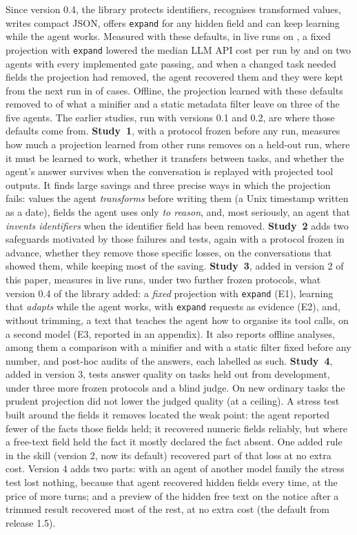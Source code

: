 Since version 0.4, the library protects identifiers, recognises transformed values, writes compact JSON,
offers \texttt{expand} for any hidden field and can keep learning while the agent works. Measured with these
defaults, in live runs on \texttt{\SthreeModelA}, a fixed projection with \texttt{expand} lowered the median LLM
API cost per run by \SthreeEOneTrimCosti{} and \SthreeEOneTrimCostiv{} on two agents with every implemented gate
passing, and when a changed task needed fields the projection had removed, the agent recovered them and they were
kept from the next run in \SthreeHFiveKept{} of \SthreeHFiveRecoveries{} cases. Offline, the projection learned with
these defaults removed \BaseLearnedStaticBigMin{} to \BaseLearnedStaticBigMax{} of what a minifier and a static
metadata filter leave on three of the five agents. The earlier studies, run with versions 0.1 and 0.2, are where
those defaults come from.
 \textbf{Study~1}, with a protocol frozen before any run, measures how much a projection
learned from other runs removes on a held-out run, where it must be learned to work, whether it transfers between
tasks, and whether the agent's answer survives when the conversation is replayed with projected tool outputs. It
finds large savings and three precise ways in which the projection fails: values the agent \emph{transforms}
before writing them (a Unix timestamp written as a date), fields the agent uses only \emph{to reason}, and, most
seriously, an agent that \emph{invents identifiers} when the identifier field has been removed. \textbf{Study~2}
adds two safeguards motivated by those failures and tests, again with a protocol frozen in advance, whether they
remove those specific losses, on the conversations that showed them, while keeping most of the saving.
\textbf{Study~3}, added in version 2 of this paper, measures in live runs, under two further frozen protocols, what
version 0.4 of the library added: a \emph{fixed} projection with \texttt{expand} (E1), learning that \emph{adapts}
while the agent works, with \texttt{expand} requests as evidence (E2), and, without trimming, a text that teaches the
agent how to organise its tool calls, on a second model (E3, reported in an appendix). It also reports offline
analyses, among them a comparison with a minifier and with a static filter fixed before any number, and post-hoc
audits of the answers, each labelled as such. \textbf{Study~4}, added in version 3, tests answer quality on tasks
held out from development, under three more frozen protocols and a blind judge. On new ordinary tasks the prudent
projection did not lower the judged quality (at a ceiling). A stress test built around the fields it removes
located the weak point: the agent reported fewer of the facts those fields held; it recovered numeric fields
reliably, but where a free-text field held the fact it mostly declared the fact absent. One added rule in the skill
(version 2, now its default) recovered part of that loss at no extra cost. Version 4 adds two parts: with an agent of
another model family the stress test lost nothing, because that agent recovered hidden fields every time, at the
price of more turns; and a preview of the hidden free text on the notice after a trimmed result recovered most of the
rest, at no extra cost (the default from release 1.5).

